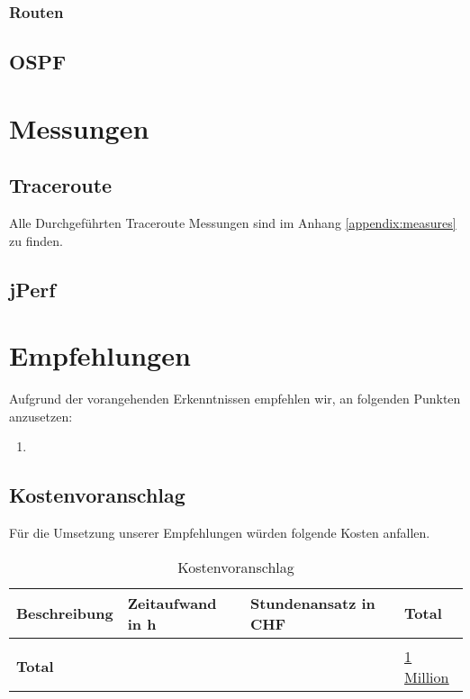 \subsubsection{Routen}

\subsection{OSPF}


\section{Messungen}
\subsection{Traceroute}
Alle Durchgeführten Traceroute Messungen sind im Anhang \ref{appendix:measures} zu finden.




\subsection{jPerf}




\section{Empfehlungen}
Aufgrund der vorangehenden Erkenntnissen empfehlen wir, an folgenden Punkten anzusetzen:
\begin{enumerate}
	\item 
\end{enumerate}

\subsection{Kostenvoranschlag}
Für die Umsetzung unserer Empfehlungen würden folgende Kosten anfallen.
\begin{table}[h]
	\centering
	\begin{tabu} to \linewidth {l l l l}
		\toprule 
		Beschreibung & Zeitaufwand in h  & Stundenansatz in CHF & Total \\
		\midrule
		&&& \\
		\textbf{Total} & & & \underline{\underline{1 Million}} \\
		\bottomrule 
	\end{tabu} 
	\caption{Kostenvoranschlag}
\end{table}

